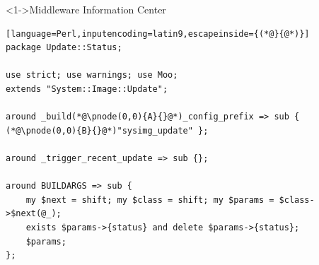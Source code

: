 \documentclass[ngerman,xcolor={table,dvipsnames},smaller,compress,hyperref={bookmarks,colorlinks},handout]{beamer}%
\begin{document}
\begin{frame}[t,fragile]

\begin{block}<1->{Middleware Information Center}
\scriptsize
\begin{lstlisting}[language=Perl,inputencoding=latin9,escapeinside={(*@}{@*)}]
package Update::Status;

use strict; use warnings; use Moo;
extends "System::Image::Update";

around _build(*@\pnode(0,0){A}{}@*)_config_prefix => sub { (*@\pnode(0,0){B}{}@*)"sysimg_update" };

around _trigger_recent_update => sub {};

around BUILDARGS => sub {
    my $next = shift; my $class = shift; my $params = $class->$next(@_);
    exists $params->{status} and delete $params->{status};
    $params;
};
\end{lstlisting}
\end{block}

\begin{itemize}
\end{itemize}

\end{frame}
\end{document}
